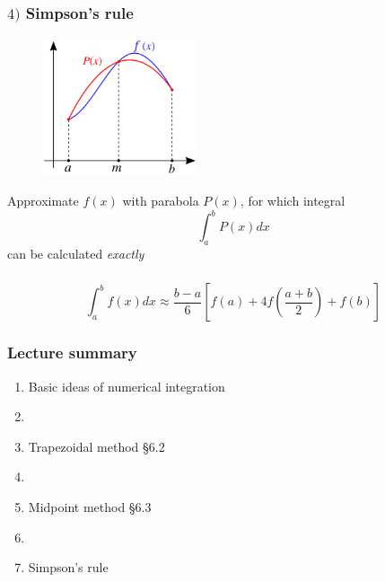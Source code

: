 \documentclass[english,14pt]{beamer}
\newcommand\red[1]{{\color{red} #1}}
\newcommand\blue[1]{{\color{blue} #1}}
\begin{document}

\begin{frame}[fragile]

\frametitle{$4)$ Simpson's rule}

\begin{figure}[ht]
	\centering
	\includegraphics[width=0.4\textwidth]{figures/SimpsonsRule}
\end{figure}

Approximate \blue{$f(x)$} with parabola \red{$P(x)$}, for which integral
\[
\int_a^b P(x) dx
\]
can be calculated \emph{exactly}

\end{frame}


\begin{frame}[fragile]

\frametitle{}

\[
\int_a^b f(x)dx \approx \frac{b-a}{6} \left[ f(a) + 4f\left(\frac{a+b}{2}\right) + f(b)\right]
\]

\end{frame}


\begin{frame}[fragile]

\frametitle{Lecture summary}

\begin{enumerate}
	\item Basic ideas of numerical integration
	
	\item[]
	
	\item Trapezoidal method \red{\S6.2}
	
	\item[]
	
	\item Midpoint method \red{\S6.3}
	
	\item[]
	
	\item Simpson's rule
	
\end{enumerate}

\end{frame}
\end{document}
